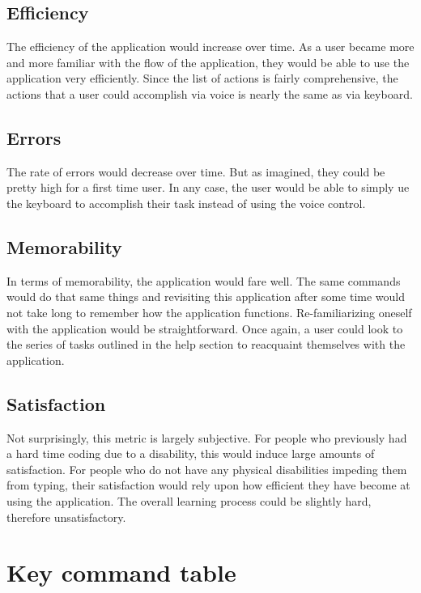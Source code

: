 \documentclass[11pt, oneside]{article}
\begin{document}
\subsection{Efficiency}
The efficiency of the application would increase over time. As a user became more and more familiar with the flow of the application, they would be able to use the application very efficiently. Since the list of actions is fairly comprehensive, the actions that a user could accomplish via voice is nearly the same as via keyboard.

\subsection{Errors}
The rate of errors would decrease over time. But as imagined, they could be pretty high for a first time user. In any case, the user would be able to simply ue the keyboard to accomplish their task instead of using the voice control.

\subsection{Memorability}
In terms of memorability, the application would fare well. The same commands would do that same things and revisiting this application after some time would not take long to remember how the application functions. Re-familiarizing oneself with the application would be straightforward. Once again, a user could look to the series of tasks outlined in the help section to reacquaint themselves with the application.

\subsection{Satisfaction}
Not surprisingly, this metric is largely subjective. For people who previously had a hard time coding due to a disability, this would induce large amounts of satisfaction. For people who do not have any physical disabilities impeding them from typing, their satisfaction would rely upon how efficient they have become at using the application. The overall learning process could be slightly hard, therefore unsatisfactory.

\pagebreak


\section{Key command table}
\end{document}
